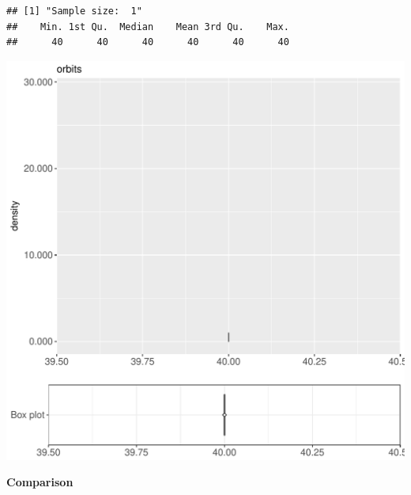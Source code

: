 \documentclass{article}\usepackage[]{graphicx}\usepackage[]{color}
\makeatletter
\def\maxwidth{ %
  \ifdim\Gin@nat@width>\linewidth
    \linewidth
  \else
    \Gin@nat@width
  \fi
}
\newenvironment{kframe}{%
 \def\at@end@of@kframe{}%
 \ifinner\ifhmode%
  \def\at@end@of@kframe{\end{minipage}}%
  \begin{minipage}{\columnwidth}%
 \fi\fi%
 \def\FrameCommand##1{\hskip\@totalleftmargin \hskip-\fboxsep
 \colorbox{shadecolor}{##1}\hskip-\fboxsep
     \hskip-\linewidth \hskip-\@totalleftmargin \hskip\columnwidth}%
 \MakeFramed {\advance\hsize-\width
   \@totalleftmargin\z@ \linewidth\hsize
   \@setminipage}}%
 {\par\unskip\endMakeFramed%
 \at@end@of@kframe}
\newenvironment{knitrout}{}{} %
\makeatother
\begin{document}
\begin{knitrout}
\color{fgcolor}\begin{kframe}
\begin{verbatim}
## [1] "Sample size:  1"
##    Min. 1st Qu.  Median    Mean 3rd Qu.    Max. 
##      40      40      40      40      40      40
\end{verbatim}


{\ttfamily\noindent\bfseries{}}\end{kframe}
\includegraphics[width=\maxwidth]{figure/RH7_cashewExceptRemove_big-1} 

\end{knitrout}
  
 \textbf{Comparison}
  
\end{document}
